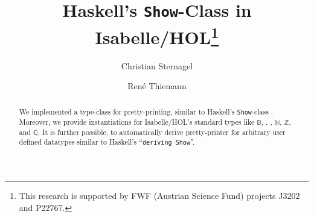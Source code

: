 \documentclass[11pt,a4paper]{article}
\newcommand\nats{\mathbb{N}}
\newcommand\bools{\mathbb{B}}
\newcommand\ints{\mathbb{Z}}
\newcommand\rats{\mathbb{Q}}
\newcommand\Show{\texttt{Show}}
\begin{document}
\title{Haskell's \Show-Class in Isabelle/HOL\thanks{This research is supported by FWF (Austrian Science Fund) projects J3202 and P22767.}}
\author{Christian Sternagel \and Ren\'e Thiemann}
\maketitle

\begin{abstract}
  We implemented a type-class for pretty-printing, similar to Haskell's
  \Show-class \cite{HaskellTutorial}. Moreover, we provide instantiations for Isabelle/HOL's 
  standard types like $\bools$, , , $\nats$, $\ints$, and $\rats$.
  It is further possible, to automatically derive pretty-printer for
  arbitrary user defined datatypes similar to Haskell's ``\texttt{deriving Show}''.
\end{abstract}



\tableofcontents





\end{document}
